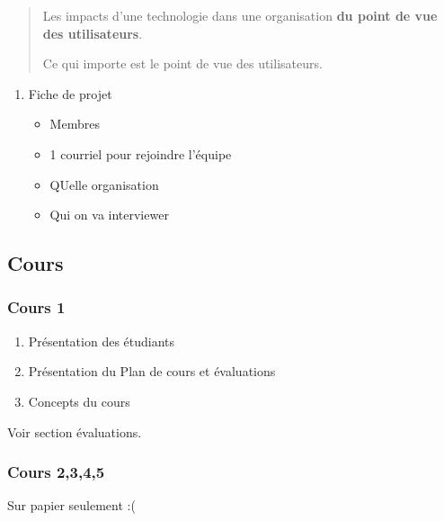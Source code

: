 \documentclass[11pt]{article}
\begin{document}
\begin{quote}
Les impacts d'une technologie dans une organisation \textbf{du point de vue des
utilisateurs}.

Ce qui importe est le point de vue des utilisateurs.
\end{quote}

\begin{enumerate}
\item Fiche de projet
\label{sec:org2c79082}
\begin{itemize}
\item Membres
\item 1 courriel pour rejoindre l'équipe
\item QUelle organisation
\item Qui on va interviewer
\end{itemize}
\end{enumerate}
\subsection{Cours}
\label{sec:org1aa8577}
\subsubsection{Cours 1}
\label{sec:org8d20138}
\begin{enumerate}
\item Présentation des étudiants
\item Présentation du Plan de cours et évaluations
\item Concepts du cours
\end{enumerate}
Voir section évaluations.
\subsubsection{Cours 2,3,4,5}
\label{sec:orgc274452}
Sur papier seulement :(
\end{document}
